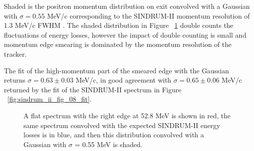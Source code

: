 Shaded is the positron momentum distribution on exit convolved with
a Gaussian with $\sigma = 0.55$ MeV/c corresponding to the SINDRUM-II
momentum resolution of 1.3 MeV/c FWHM \cite{sindrum_ii:Kaulard1997_Thesis}.
The shaded distribution in Figure ~\ref{fig:sindrum_ii_michel_calibration}
double counts the fluctuations of energy losses, however the impact of double
counting is small and momentum edge smearing is dominated by the momentum
resolution of the tracker.

The fit of the high-momentum part of the smeared edge with the Gaussian returns
$\sigma = 0.63 \pm 0.03$ MeV/c, in good agreement with $\sigma = 0.65 \pm 0.06$ MeV/c
returned by the fit of the SINDRUM-II spectrum in Figure ~\ref{fig:sindrum_ii_fig_08_fit}.

\begin{figure} 
\caption{
  \label{fig:sindrum_ii_michel_calibration}
  A flat spectrum with the right edge at 52.8 MeV is shown in red,
  the same spectrum convolved with the expected SINDRUM-II energy losses is in blue,
  and then this distribution convolved with a Gaussian with $\sigma$ = 0.55 MeV is shaded.
}
\end{figure}


